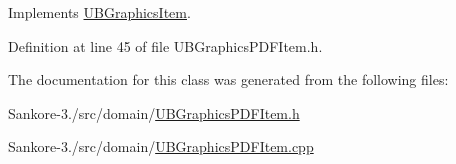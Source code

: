 Implements \hyperlink{class_u_b_graphics_item_acab0781401cac08c9ad99b0cd0fa8480}{U\-B\-Graphics\-Item}.



Definition at line 45 of file U\-B\-Graphics\-P\-D\-F\-Item.\-h.



The documentation for this class was generated from the following files\-:\begin{DoxyCompactItemize}
\item 
Sankore-\/3./src/domain/\hyperlink{_u_b_graphics_p_d_f_item_8h}{U\-B\-Graphics\-P\-D\-F\-Item.\-h}\item 
Sankore-\/3./src/domain/\hyperlink{_u_b_graphics_p_d_f_item_8cpp}{U\-B\-Graphics\-P\-D\-F\-Item.\-cpp}\end{DoxyCompactItemize}
